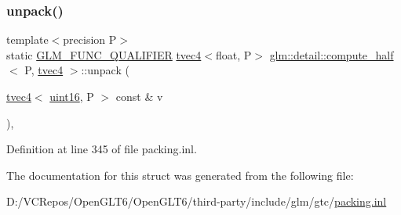 \subsubsection{\texorpdfstring{unpack()}{unpack()}}
{\footnotesize\ttfamily template$<$precision P$>$ \\
static \mbox{\hyperlink{setup_8hpp_a33fdea6f91c5f834105f7415e2a64407}{G\+L\+M\+\_\+\+F\+U\+N\+C\+\_\+\+Q\+U\+A\+L\+I\+F\+I\+ER}} \mbox{\hyperlink{structglm_1_1tvec4}{tvec4}}$<$float, P$>$ \mbox{\hyperlink{structglm_1_1detail_1_1compute__half}{glm\+::detail\+::compute\+\_\+half}}$<$ P, \mbox{\hyperlink{structglm_1_1tvec4}{tvec4}} $>$\+::unpack (\begin{DoxyParamCaption}\item[{\mbox{\hyperlink{structglm_1_1tvec4}{tvec4}}$<$ \mbox{\hyperlink{namespaceglm_1_1detail_a47b2a7d006d187338e8031a352d1ce56}{uint16}}, P $>$ const \&}]{v }\end{DoxyParamCaption})\hspace{0.3cm}{\ttfamily [inline]}, {\ttfamily [static]}}



Definition at line 345 of file packing.\+inl.



The documentation for this struct was generated from the following file\+:\begin{DoxyCompactItemize}
\item 
D\+:/\+V\+C\+Repos/\+Open\+G\+L\+T6/\+Open\+G\+L\+T6/third-\/party/include/glm/gtc/\mbox{\hyperlink{packing_8inl}{packing.\+inl}}\end{DoxyCompactItemize}
